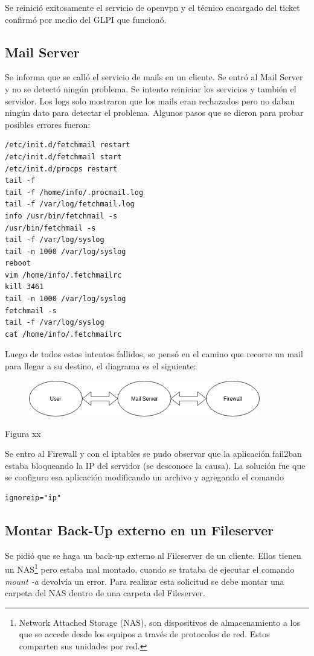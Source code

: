 \documentclass[12pt,a4paper]{article}
\begin{document}
Se reinició exitosamente el servicio de openvpn y el técnico encargado del ticket confirmó por medio del GLPI que funcionó.

\subsection{Mail Server} 
Se informa que se calló el servicio de mails en un cliente. Se entró al Mail Server y no se detectó ningún problema. Se intento reiniciar los servicios y también el servidor. Los logs solo mostraron que los mails eran rechazados pero no daban ningún dato para detectar el problema. Algunos pasos que se dieron para probar posibles errores fueron:

\begin{lstlisting}
/etc/init.d/fetchmail restart
/etc/init.d/fetchmail start 
/etc/init.d/procps restart
tail -f
tail -f /home/info/.procmail.log
tail -f /var/log/fetchmail.log
info /usr/bin/fetchmail -s
/usr/bin/fetchmail -s
tail -f /var/log/syslog
tail -n 1000 /var/log/syslog
reboot
vim /home/info/.fetchmailrc 
kill 3461
tail -n 1000 /var/log/syslog
fetchmail -s
tail -f /var/log/syslog
cat /home/info/.fetchmailrc 
\end{lstlisting}

Luego de todos estos intentos fallidos, se pensó en el camino que recorre un mail para llegar a su destino, el diagrama es el siguiente:

\begin{figure}
  \centering
   \includegraphics[width=0.9\textwidth]{ms-diagram}
  \label{fig:ms-diagram}
\end{figure}

Figura xx


Se entro al Firewall y con el iptables se pudo observar que la aplicación fail2ban estaba bloqueando la IP del servidor (se desconoce la causa). La solución fue que se configuro esa aplicación modificando un archivo y agregando el comando

\begin{lstlisting}
ignoreip="ip"
\end{lstlisting}

\subsection{Montar Back-Up externo en un Fileserver} 
Se pidió que se haga un back-up externo al Fileserver de un cliente. Ellos tienen un NAS\footnote{Network Attached Storage (NAS), son dispositivos de almacenamiento a los que se accede desde los equipos a través de protocolos de red. Estos comparten sus unidades por red.}  pero estaba mal montado, cuando se trataba de ejecutar el comando \textit{mount -a} devolvía un error. Para realizar esta solicitud se debe montar una carpeta del NAS dentro de una carpeta del Fileserver.
\end{document}
